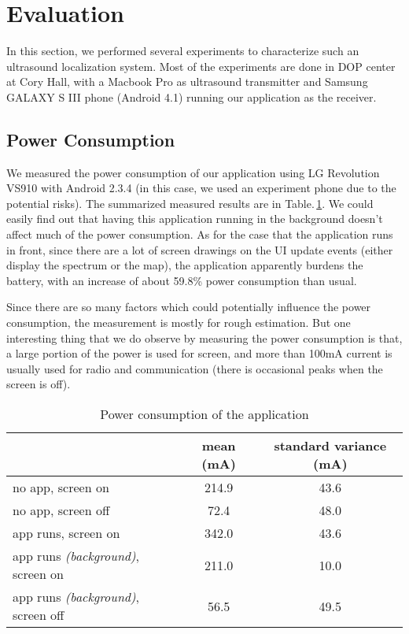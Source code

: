 \section{Evaluation}
\label{sec:evaluation}

In this section, we performed several experiments to characterize such an ultrasound localization system. Most of the experiments are done in DOP center at Cory Hall, with a Macbook Pro as ultrasound transmitter and Samsung GALAXY S III phone (Android 4.1) running our application as the receiver.

\subsection{Power Consumption}
\label{sec:power-consumption}
We measured the power consumption of our application using LG Revolution VS910 with Android 2.3.4  (in this case, we used an experiment phone due to the potential risks). The summarized measured results are in Table.\,\ref{tab:power}. We could easily find out that having this application running in the background doesn't affect much of the power consumption. As for the case that the application runs in front, since there are a lot of screen drawings on the UI update events (either display the spectrum or the map), the application apparently burdens the battery, with an increase of about 59.8\% power consumption than usual.

Since there are so many factors which could potentially influence the power consumption, the measurement is mostly for rough estimation. But one interesting thing that we do observe by measuring the power consumption is that, a large portion of the power is used for screen, and more than 100mA current is usually used for radio and communication (there is occasional peaks when the screen is off). 

\begin{table}
  \centering
  \begin{tabular}{|l|c|c|}
    \hline
    & mean (mA) & standard variance (mA) \\
    \hline
    no app, screen on &  214.9 & 43.6 \\
    no app, screen off &  72.4 & 48.0 \\
    \hline
    app runs, screen on &  342.0 & 43.6 \\
    app runs {\em (background)}, screen on & 211.0 & 10.0 \\
    app runs {\em (background)}, screen off &  56.5 & 49.5 \\
    \hline
  \end{tabular}
  \caption{Power consumption of the application}
  \label{tab:power}
\end{table}


